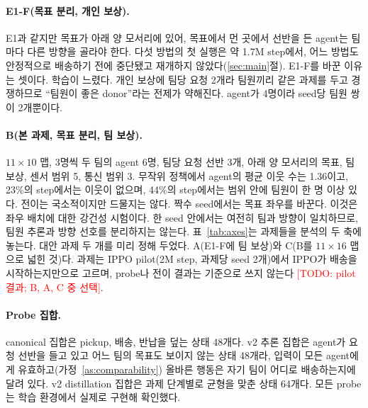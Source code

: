 \documentclass[twocolumn,10pt]{article}
\theoremstyle{remark}
\newcommand{\todo}[1]{\textcolor{red}{[TODO: #1]}}
\begin{document}
\paragraph{E1-F(목표 분리, 개인 보상).} E1과 같지만 목표가 아래 양 모서리에 있어, 목표에서 먼 곳에서 선반을 든 agent는 팀마다
다른 방향을 골라야 한다. 다섯 방법의 첫 실행은 약 1.7M step에서, 어느 방법도 안정적으로 배송하기 전에 중단됐고 재개하지
않았다(\ref{sec:main}절). E1-F를 바꾼 이유는 셋이다. 학습이 느렸다. 개인 보상에 팀당 요청 2개라 팀원끼리 같은 과제를 두고
경쟁하므로 ``팀원이 좋은 donor''라는 전제가 약해진다. agent가 4명이라 seed당 팀원 쌍이 2개뿐이다.

\paragraph{B(본 과제, 목표 분리, 팀 보상).} $11\times10$ 맵, 3명씩 두 팀의 agent 6명, 팀당 요청 선반 3개, 아래 양 모서리의 목표,
팀 보상, 센서 범위 5, 통신 범위 3. 무작위 정책에서 agent의 평균 이웃 수는 1.36이고, 23\%의 step에서는 이웃이 없으며, 44\%의
step에서는 범위 안에 팀원이 한 명 이상 있다. 전이는 국소적이지만 드물지는 않다. 짝수 seed에서는 목표 좌우를 바꾼다. 이것은
좌우 배치에 대한 강건성 시험이다. 한 seed 안에서는 여전히 팀과 방향이 일치하므로, 팀원 추론과 방향 선호를 분리하지는 않는다.
표~\ref{tab:axes}는 과제들을 분석의 두 축에 놓는다. 대안 과제 두 개를 미리 정해 두었다. A(E1-F에 팀 보상)와 C(B를
$11\times16$ 맵으로 넓힌 것)다. 과제는 IPPO pilot(2M step, 과제당 seed 2개)에서 IPPO가 배송을 시작하는지만으로 고르며, probe나
전이 결과는 기준으로 쓰지 않는다 \todo{pilot 결과; B, A, C 중 선택}.

\begin{table}[t]
\centering
\small
{}
\caption{분석의 두 축에 놓은 과제. E1: 명제~\ref{prop:nonid}로 식별 가능성이 배제되고, 고정된 커리큘럼 모델에서는 팀원보다
다른 팀 agent의 critic과 섞을 때 더 도움이 됐다. E1-F, B, A: 목표 배치상 식별 가능할 것으로 예상하며 호환성은 측정 예정이다
\todo{측정 후 B 위치 확정}.}
\label{tab:axes}
\end{table}

\paragraph{Probe 집합.} canonical 집합은 pickup, 배송, 반납을 덮는 상태 48개다. v2 추론 집합은 agent가 요청 선반을 들고 있고 어느
팀의 목표도 보이지 않는 상태 48개라, 입력이 모든 agent에게 유효하고(가정~\ref{as:comparability}) 올바른 행동은 자기 팀이 어디로
배송하는지에 달려 있다. v2 distillation 집합은 과제 단계별로 균형을 맞춘 상태 64개다. 모든 probe는 학습 환경에서 실제로 구현해
확인했다.
\end{document}
